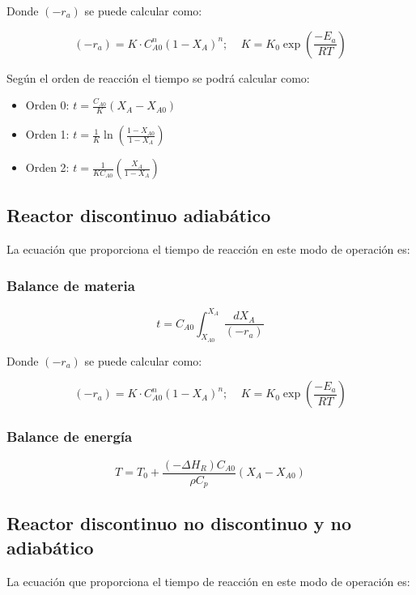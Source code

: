 \documentclass[20pt,a4paper]{extarticle}
\begin{document}
			Donde $(-r_a)$ se puede calcular como:
		
			\begin{equation*}
				(-r_a) = K \cdot C_{A0}^n (1-X_A)^n; ~~~~~ K = K_0\exp\left(\frac{-E_a}{RT}\right)
			\end{equation*}
			
			Según el orden de reacción el tiempo se podrá calcular como:
			
			\begin{itemize}
				\item Orden 0: $ t = \frac{C_{A0}}{K}(X_A-X_{A0})$
				\item Orden 1: $ t = \frac{1}{K}\ln\left(\frac{1-X_{A0}}{1-X_A}\right)$
				\item Orden 2: $ t = \frac{1}{KC_{A0}}\left(\frac{X_A}{1- X_A}\right)$
			\end{itemize}
	
	
	\subsection{Reactor discontinuo adiabático}
		La ecuación que proporciona el tiempo de reacción en este modo de operación es:
	
		\subsubsection{Balance de materia}
			\begin{equation*}
			t = C_{A0}\int_{X_{A0}}^{X_A}\frac{dX_A}{(-r_a)}
			\end{equation*}
			
			Donde $(-r_a)$ se puede calcular como:
			
			\begin{equation*}
			(-r_a) = K \cdot C_{A0}^n (1-X_A)^n; ~~~~~ K = K_0\exp\left(\frac{-E_a}{RT}\right)
			\end{equation*}
			
		\subsubsection{Balance de energía}
			\begin{equation*}
				T = T_0 + \frac{(-\Delta H_R)C_{A0}}{\rho C_p}(X_A-X_{A0})
			\end{equation*}
			
	\subsection{Reactor discontinuo no discontinuo y no adiabático}
		La ecuación que proporciona el tiempo de reacción en este modo de operación es:
		
\end{document}
